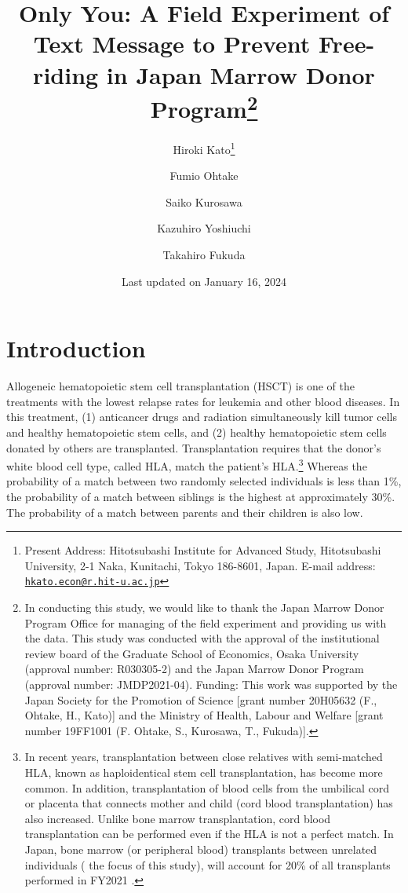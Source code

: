 \documentclass[12pt, a4paper]{article}
\title{Only You:
A Field Experiment of Text Message to Prevent Free-riding in Japan Marrow Donor Program\thanks{In conducting this study, we would like to thank the Japan Marrow Donor Program Office for managing of the field experiment and providing us with the data. This study was conducted with the approval of the institutional review board of the Graduate School of Economics, Osaka University (approval number: R030305-2) and the Japan Marrow Donor Program (approval number: JMDP2021-04). Funding: This work was supported by the Japan Society for the Promotion of Science {[}grant number 20H05632 (F., Ohtake, H., Kato){]} and the Ministry of Health, Labour and Welfare {[}grant number 19FF1001 (F. Ohtake, S., Kurosawa, T., Fukuda){]}.}}
\author[a]{%
  Hiroki Kato\thanks{Present Address: Hitotsubashi Institute for Advanced Study, Hitotsubashi University, 2-1 Naka, Kunitachi, Tokyo 186-8601, Japan. E-mail address: \href{mailto:hkato.econ@r.hit-u.ac.jp}{\nolinkurl{hkato.econ@r.hit-u.ac.jp}}}
}
\author[b]{%
  Fumio Ohtake
}
\author[c]{%
  Saiko Kurosawa
}
\author[d]{%
  Kazuhiro Yoshiuchi
}
\author[e]{%
  Takahiro Fukuda
}
\affil[a]{Graduate School of Economics, Osaka University}
\affil[b]{Center for Infectious Disease Education and Research (CiDER), Osaka University}
\affil[c]{Department of Oncology, Ina Central Hospital}
\affil[d]{Graduate School of Medicine, Tokyo University}
\affil[e]{Department of Hematopoietic Stem Cell Transplantation, National Cancer Center Hospital}
\date{Last updated on January 16, 2024}
\begin{document}



\hypertarget{intro}{%
\section{Introduction}\label{intro}}

Allogeneic hematopoietic stem cell transplantation (HSCT) is one of the treatments with the lowest relapse rates for leukemia and other blood diseases. In this treatment, (1) anticancer drugs and radiation simultaneously kill tumor cells and healthy hematopoietic stem cells, and (2) healthy hematopoietic stem cells donated by others are transplanted. Transplantation requires that the donor's white blood cell type, called HLA, match the patient's HLA.\footnote{In recent years, transplantation between close relatives with semi-matched HLA, known as haploidentical stem cell transplantation, has become more common. In addition, transplantation of blood cells from the umbilical cord or placenta that connects mother and child (cord blood transplantation) has also increased. Unlike bone marrow transplantation, cord blood transplantation can be performed even if the HLA is not a perfect match. In Japan, bone marrow (or peripheral blood) transplants between unrelated individuals ( the focus of this study), will account for 20\% of all transplants performed in FY2021 \citep{JapaneseDataCenterf2022}.} Whereas the probability of a match between two randomly selected individuals is less than 1\%, the probability of a match between siblings is the highest at approximately 30\%. The probability of a match between parents and their children is also low.
\end{document}
